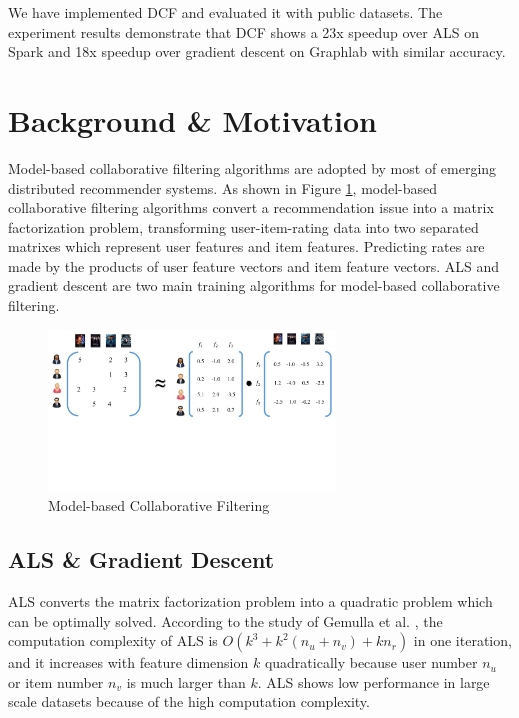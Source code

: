 \documentclass{llncs}
\begin{document}
We have implemented DCF and evaluated it with public datasets. The experiment results demonstrate that DCF shows a 23x speedup over ALS on Spark and 18x speedup over gradient descent on Graphlab with similar accuracy.

\vspace{-10pt}

\section{Background \& Motivation}
\vspace{-5pt}

\label{sec:background}

Model-based collaborative filtering algorithms are adopted by most of emerging distributed recommender systems. As shown in Figure \ref{fig:MF}, model-based collaborative filtering algorithms convert a recommendation issue into a matrix factorization problem, transforming user-item-rating data into two separated matrixes which represent user features and item features. Predicting rates are made by the products of user feature vectors and item feature vectors.
ALS and gradient descent are two main training algorithms for model-based collaborative filtering.
\vspace{-25pt}

\begin{figure}[!htb]
\centering
\includegraphics[width=3in]{pics/MFIntroduction.pdf}
\vspace{-60pt}
\caption{Model-based Collaborative Filtering}
\vspace{-15pt}
\label{fig:MF}
\end{figure}

\vspace{-25pt}
\subsection{ALS \& Gradient Descent}
\label{sub:gd}
\vspace{-5pt}

ALS \cite{ALS} converts the matrix factorization problem into a quadratic problem which can be optimally solved. According to the study of Gemulla et al. \cite{ibm2011}, the computation complexity of ALS is $O(k^3 + k^2(n_u + n_v) + kn_r)$ in one iteration, and it increases with feature dimension $k$ quadratically because user number $n_u$ or item number $n_v$ is much larger than $k$. ALS shows low performance in large scale datasets because of the high computation complexity.
\end{document}
